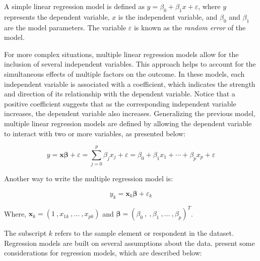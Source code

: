 \documentclass[
  12pt,
]{book}
\begin{document}
A simple linear regression model is defined as \(y = \beta_{0} + \beta_{1}x + \varepsilon\), where \(y\) represents the dependent variable, \(x\) is the independent variable, and \(\beta_{0}\) and \(\beta_{1}\) are the model parameters. The variable \(\varepsilon\) is known as the \emph{random error} of the model.

For more complex situations, multiple linear regression models allow for the inclusion of several independent variables. This approach helps to account for the simultaneous effects of multiple factors on the outcome. In these models, each independent variable is associated with a coefficient, which indicates the strength and direction of its relationship with the dependent variable. Notice that a positive coefficient suggests that as the corresponding independent variable increases, the dependent variable also increases. Generalizing the previous model, multiple linear regression models are defined by allowing the dependent variable to interact with two or more variables, as presented below:

\[
y  =  \boldsymbol{x} \boldsymbol{\beta} + \varepsilon
  =  \sum_{j=0}^{p} \beta_{j}x_{j} + \varepsilon
 =  \beta_{0} + \beta_{1} x_{1} + \cdots + \beta_{p} x_{p} + \varepsilon
\]

Another way to write the multiple regression model is:

\[
y_{k}  =  \boldsymbol{x}_{k} \boldsymbol{\beta} + \varepsilon_{k}
\]

Where, \(\boldsymbol{x}_{k} = \left( 1 \ , x_{1k} \ , \ldots\ , x_{pk} \right)\) and \(\boldsymbol{\beta} = \left( \beta_{0} \ , \ , \beta_{1} \ , \ldots \ , \beta_{p} \right)^{T}\).

The subscript \(k\) refers to the sample element or respondent in the dataset. Regression models are built on several assumptions about the data. \citet{Heeringa_West_Berglund_2017} present some considerations for regression models, which are described below:
\end{document}
